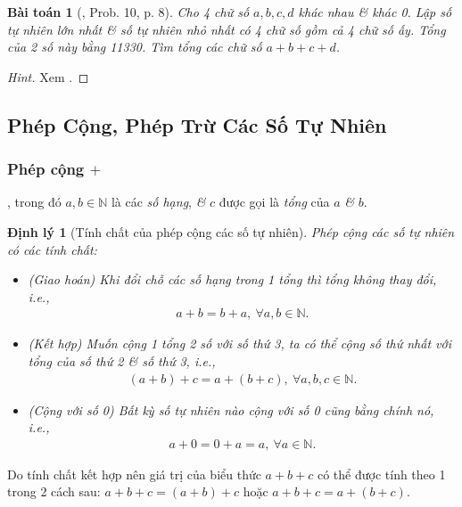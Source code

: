 \documentclass{article}
\numberwithin{equation}{section}
\newtheorem{theorem}{Định lý}[section]
\newtheorem{problem}{Bài toán}[section]
\begin{document}
\begin{problem}[\cite{Binh_Toan_6_tap_1}, Prob. 10, p. 8]
	Cho 4 chữ số $a,b,c,d$ khác nhau \& khác 0. Lập số tự nhiên lớn nhất \& số tự nhiên nhỏ nhất có 4 chữ số gồm cả 4 chữ số ấy. Tổng của 2 số này bằng 11330. Tìm tổng các chữ số $a + b + c + d$.
\end{problem}

\begin{proof}[Hint]
	Xem \cite[p. 106]{Binh_Toan_6_tap_1}.
\end{proof}

\subsection{Phép Cộng, Phép Trừ Các Số Tự Nhiên}

\subsubsection{Phép cộng $+$}
, trong đó $a,b\in\mathbb{N}$ là các \textit{số hạng}, \textit{\&} $c$ được gọi là \textit{tổng} của $a$ \textit{\&} $b$.

\begin{theorem}[Tính chất của phép cộng các số tự nhiên]
	Phép cộng các số tự nhiên có các tính chất:
	\begin{itemize}
		\item (Giao hoán) Khi đổi chỗ các số hạng trong 1 tổng thì tổng không thay đổi, i.e.,
		\begin{align*}
			a + b = b + a,\ \forall a,b\in\mathbb{N}.
		\end{align*}
		\item (Kết hợp) Muốn cộng 1 tổng 2 số với số thứ 3, ta có thể cộng số thứ nhất với tổng của số thứ 2 \textit{\&} số thứ 3, i.e.,
		\begin{align*}
			(a + b) + c = a +(b + c),\ \forall a,b,c\in\mathbb{N}.
		\end{align*}
		\item (Cộng với số 0) Bất kỳ số tự nhiên nào cộng với số 0 cũng bằng chính nó, i.e.,
		\begin{align*}
			a + 0 = 0 + a = a,\ \forall a\in\mathbb{N}.
		\end{align*}
	\end{itemize}
\end{theorem}
Do tính chất kết hợp nên giá trị của biểu thức $a + b + c$ có thể được tính theo 1 trong 2 cách sau: $a + b + c = (a + b) + c$ hoặc $a + b + c = a + (b + c)$.
\end{document}
